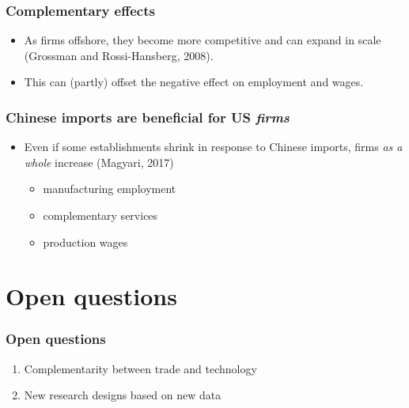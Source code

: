 \documentclass[aspectratio=169,compress,mathserif]{beamer}
\newcommand{\directory}{./exhibits}
\newcommand{\longfigure}[2]{\begin{frame}\frametitle{\hyperlink{#1back}{#2}}\hypertarget{#1}{{\begin{center}\texttt{[image: \\directory/\#1]}\end{center}}}\end{frame}}
\begin{document}
\begin{frame}\frametitle{Complementary effects}\hypertarget{Complementary effects}{}
\begin{itemize}
\item As firms offshore, they become more competitive and can expand in scale (Grossman and Rossi-Hansberg, 2008).

\item This can (partly) offset the negative effect on employment and wages.




\end{itemize}
\end{frame}



\begin{frame}\frametitle{Chinese imports are beneficial for US \emph{firms}}\hypertarget{Chinese imports are beneficial for US \emph{firms}}{}
\begin{itemize}
\item Even if some establishments shrink in response to Chinese imports, firms \emph{as a whole} increase (Magyari, 2017)
\begin{itemize}
\item manufacturing employment

\item complementary services

\item production wages


\end{itemize}

\end{itemize}
\end{frame}







\section{Open questions}\hypertarget{Open questions}{}
\begin{frame}\frametitle{Open questions}\hypertarget{Open questions}{}
\begin{enumerate}\setcounter{enumi}{0}
\item Complementarity between trade and technology

\item New research designs based on new data


\end{enumerate}
\end{frame}
\end{document}
